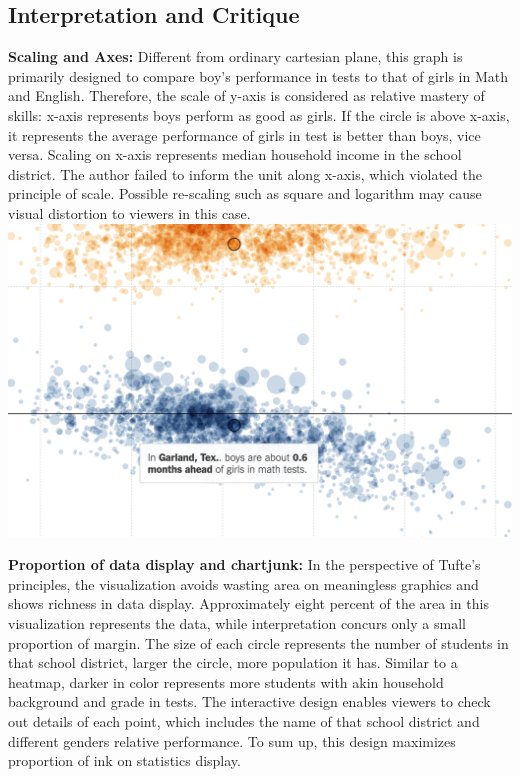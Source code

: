 \documentclass[11pt,letterpaper]{article}
\begin{document}
\subsection*{Interpretation and Critique}
\noindent \textbf{Scaling and Axes:} Different from ordinary cartesian plane, this graph is primarily designed to compare boy's performance in tests to that of girls in Math and English. Therefore, the scale of y-axis is considered as relative mastery of skills: x-axis represents boys perform as good as girls. If the circle is above x-axis, it represents the average performance of girls in test is better than boys, vice versa. Scaling on x-axis represents median household income in the school district. The author failed to inform the unit along x-axis, which violated the principle of scale. Possible re-scaling such as square and logarithm may cause visual distortion to viewers in this case. \\

\includegraphics[scale=0.5]{display-3.png}

\noindent \textbf{Proportion of data display and chartjunk:} In the perspective of Tufte’s principles, the visualization avoids wasting area on meaningless graphics and shows richness in data display. Approximately eight percent of the area in this visualization represents the data, while interpretation concurs only a small proportion of margin. The size of each circle represents the number of students in that school district, larger the circle, more population it has. Similar to a heatmap, darker in color represents more students with akin household background and grade in tests. The interactive design enables viewers to check out details of each point, which includes the name of that school district and different genders relative performance. To sum up, this design maximizes proportion of ink on statistics display. \\
\end{document}
